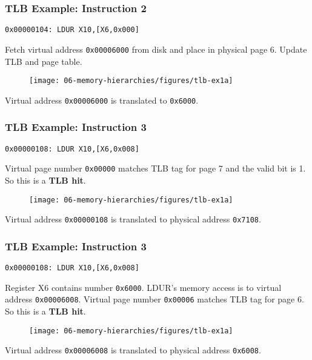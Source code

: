 {\begin{frame}[fragile]
\end{frame}
\begin{frame}[fragile]\frametitle{TLB Example: Instruction 2}
\begin{verbatim}
0x00000104: LDUR X10,[X6,0x000]
\end{verbatim}
Fetch virtual address \texttt{0x00006000} from disk and place in physical page 6. Update TLB and page table.
\begin{figure}[H]
\centering
	{\texttt{[image: 06-memory-hierarchies/figures/tlb-ex1a]}}
\end{figure}
Virtual address \texttt{0x00006000} is translated to \texttt{0x6000}.
\end{frame}
\begin{frame}[fragile]\frametitle{TLB Example: Instruction 3}
\begin{verbatim}
0x00000108: LDUR X10,[X6,0x008]
\end{verbatim}
Virtual page number \texttt{0x00000} matches TLB tag for page 7 and the valid bit is 1. So this is a \textbf{TLB hit}.
\begin{figure}[H]
\centering
	{\texttt{[image: 06-memory-hierarchies/figures/tlb-ex1a]}}
\end{figure}
Virtual address \texttt{0x00000108} is translated to physical address \texttt{0x7108}.
\end{frame}
\begin{frame}[fragile]\frametitle{TLB Example: Instruction 3}
\begin{verbatim}
0x00000108: LDUR X10,[X6,0x008]
\end{verbatim}
Register X6 contains number \texttt{0x6000}. LDUR's memory access is to virtual address \texttt{0x00006008}. Virtual page number \texttt{0x00006}  matches TLB tag for page 6. So this is a \textbf{TLB hit}.
\begin{figure}[H]
\centering
	{\texttt{[image: 06-memory-hierarchies/figures/tlb-ex1a]}}
\end{figure}
Virtual address \texttt{0x00006008} is translated to physical address \texttt{0x6008}.
\end{frame}


}
